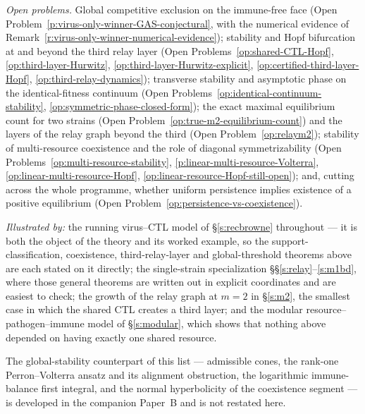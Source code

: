 \emph{Open problems.} Global competitive exclusion on the immune-free face
(Open Problem~\ref{p:virus-only-winner-GAS-conjectural}, with the numerical evidence of
Remark~\ref{r:virus-only-winner-numerical-evidence}); stability and Hopf bifurcation at and beyond the third
relay layer (Open Problems~\ref{op:shared-CTL-Hopf}, \ref{op:third-layer-Hurwitz},
\ref{op:third-layer-Hurwitz-explicit}, \ref{op:certified-third-layer-Hopf},
\ref{op:third-relay-dynamics}); transverse stability and asymptotic phase on the identical-fitness continuum
(Open Problems~\ref{op:identical-continuum-stability}, \ref{op:symmetric-phase-closed-form}); the exact
maximal equilibrium count for two strains (Open Problem~\ref{op:true-m2-equilibrium-count}) and the layers
of the relay graph beyond the third (Open Problem~\ref{op:relaym2}); stability of multi-resource coexistence
and the role of diagonal symmetrizability
(Open Problems~\ref{op:multi-resource-stability}, \ref{p:linear-multi-resource-Volterra},
\ref{op:linear-multi-resource-Hopf}, \ref{op:linear-resource-Hopf-still-open}); and, cutting across the whole
programme, whether uniform persistence implies existence of a positive equilibrium
(Open Problem~\ref{op:persistence-vs-coexistence}).

\emph{Illustrated by:} the running virus--CTL model of \S\ref{s:recbrowne} throughout --- it is both the
object of the theory and its worked example, so the support-classification, coexistence, third-relay-layer
and global-threshold theorems above are each stated on it directly; the single-strain specialization
\S\S\ref{s:relay}--\ref{s:m1bd}, where those general theorems are written out in explicit coordinates and
are easiest to check; the growth of the relay graph at $m=2$ in \S\ref{s:m2}, the smallest case in which the
shared CTL creates a third layer; and the modular resource--pathogen--immune model of \S\ref{s:modular},
which shows that nothing above depended on having exactly one shared resource.

The global-stability counterpart of this list --- admissible cones, the rank-one Perron--Volterra ansatz and
its alignment obstruction, the logarithmic immune-balance first integral, and the normal hyperbolicity of
the coexistence segment --- is developed in the companion Paper~B and is not restated here.
